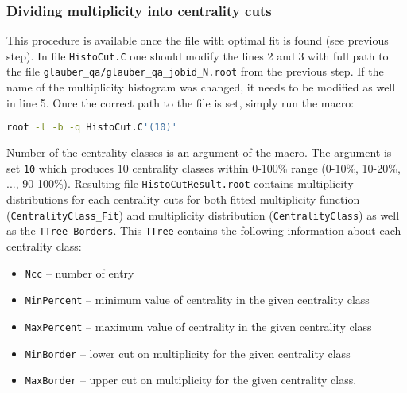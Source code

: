 \documentclass[11pt]{article}
\begin{document}
\subsubsection{Dividing multiplicity into centrality cuts}
This procedure is available once the file with optimal fit is found (see previous step).
In file \texttt{HistoCut.C} one should modify the lines 2 and 3 with full path to the file \texttt{glauber\_qa/glauber\_qa\_jobid\_N.root} from the previous step.
If the name of the multiplicity histogram was changed, it needs to be modified as well in line 5.
Once the correct path to the file is set, simply run the macro:
\begin{lstlisting}[language=bash,caption={}]
root -l -b -q HistoCut.C'(10)'
\end{lstlisting}
%
Number of the centrality classes is an argument of the macro. The argument is set \texttt{10} which produces 10 centrality classes within 0-100\% range (0-10\%, 10-20\%, ..., 90-100\%).
Resulting file \texttt{HistoCutResult.root} contains multiplicity distributions for each centrality cuts for both fitted multiplicity function (\texttt{CentralityClass\_Fit}) and multiplicity distribution (\texttt{CentralityClass}) as well as the \texttt{TTree Borders}. This \texttt{TTree} contains the following information about each centrality class:
\begin{itemize}
    \item \texttt{Ncc} -- number of entry
    \item \texttt{MinPercent} -- minimum value of centrality in the given centrality class
    \item \texttt{MaxPercent} -- maximum value of centrality in the given centrality class
    \item \texttt{MinBorder} -- lower cut on multiplicity for the given centrality class
    \item \texttt{MaxBorder} -- upper cut on multiplicity for the given centrality class.
\end{itemize}
\end{document}
